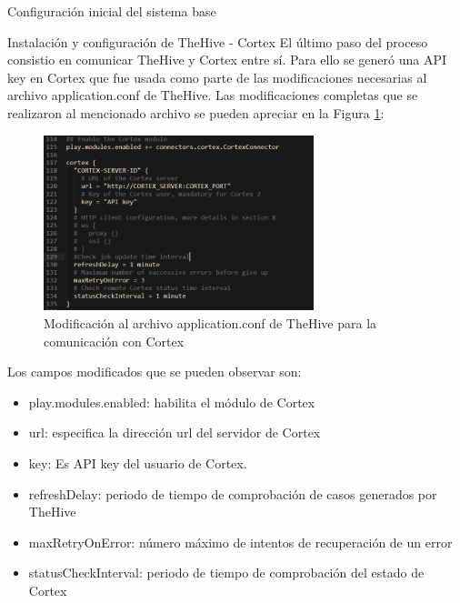 \begin{section}{Configuración inicial del sistema base}
\begin{subsection}{Instalación y configuración de TheHive - Cortex}
        El último paso del proceso consistio en comunicar TheHive y Cortex entre sí. Para ello se generó una API key en Cortex que fue usada como parte de las modificaciones necesarias al archivo application.conf de TheHive. Las modificaciones completas que se realizaron al mencionado archivo se pueden apreciar en la Figura \ref{fig:figura_40_thehive_cortex_conf}:\par
        
        \begin{figure}[H]
            \centering
            \includegraphics[width=0.7\textwidth]{./iteracion_1_imagenes/figura_40_thehive_cortex_conf.png}
            \caption{Modificación al archivo application.conf de TheHive para la comunicación con Cortex}
            \label{fig:figura_40_thehive_cortex_conf}
        \end{figure}
        Los campos modificados que se pueden observar son:
        \begin{itemize}
            \item play.modules.enabled: habilita el módulo de Cortex
            \item url: especifica la dirección url del servidor de Cortex
            \item key: Es API key del usuario de Cortex.
            \item refreshDelay: periodo de tiempo de comprobación de casos generados por TheHive
            \item maxRetryOnError: número máximo de intentos de recuperación de un error
            \item statusCheckInterval: periodo de tiempo de comprobación del estado de Cortex
        \end{itemize}
        
        \end{subsection}
    \end{section}
    
